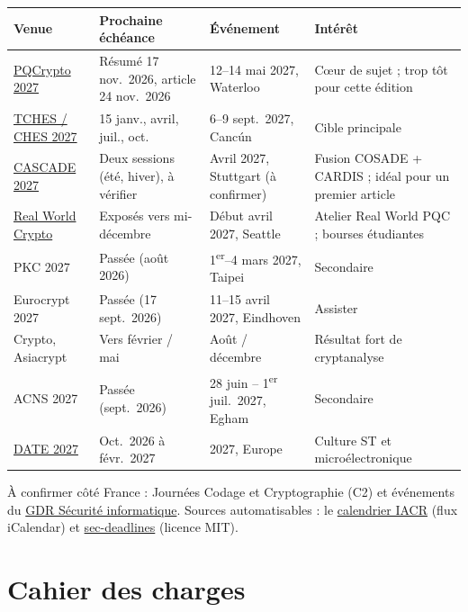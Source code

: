 \documentclass[11pt,a4paper]{article}
\begin{document}
\begin{center}\small
\begin{tabularx}{\linewidth}{P{2.6cm} P{3.3cm} P{3.2cm} L}
\toprule
\textbf{Venue} & \textbf{Prochaine échéance} & \textbf{Événement} & \textbf{Intérêt}\\
\midrule
\href{https://easychair.org/cfp/pqcrypto2027}{PQCrypto 2027} & Résumé 17 nov.\ 2026, article 24 nov.\ 2026 & 12--14 mai 2027, Waterloo & Cœur de sujet ; trop tôt pour cette édition\\
\href{https://tches.iacr.org/index.php/TCHES/submission}{TCHES / CHES 2027} & 15 janv., avril, juil., oct. & 6--9 sept.\ 2027, Cancún & Cible principale\\
\href{https://cascade-conference.org/}{CASCADE 2027} & Deux sessions (été, hiver), à vérifier & Avril 2027, Stuttgart (à confirmer) & Fusion COSADE + CARDIS ; idéal pour un premier article\\
\href{https://rwc.iacr.org/}{Real World Crypto} & Exposés vers mi-décembre & Début avril 2027, Seattle & Atelier Real World PQC ; bourses étudiantes\\
PKC 2027 & Passée (août 2026) & 1\textsuperscript{er}--4 mars 2027, Taipei & Secondaire\\
Eurocrypt 2027 & Passée (17 sept.\ 2026) & 11--15 avril 2027, Eindhoven & Assister\\
Crypto, Asiacrypt & Vers février / mai & Août / décembre & Résultat fort de cryptanalyse\\
ACNS 2027 & Passée (sept.\ 2026) & 28 juin -- 1\textsuperscript{er} juil.\ 2027, Egham & Secondaire\\
\href{https://www.date-conference.com/call-for-papers}{DATE 2027} & Oct.\ 2026 à févr.\ 2027 & 2027, Europe & Culture ST et microélectronique\\
\bottomrule
\end{tabularx}
\end{center}

\noindent À confirmer côté France : Journées Codage et Cryptographie (C2) et
événements du \href{https://gdr-securite.irisa.fr/}{GDR Sécurité informatique}.
Sources automatisables : le
\href{https://www.iacr.org/events/eventsbysubmission.php4}{calendrier IACR} (flux
iCalendar) et \href{https://sec-deadlines.github.io}{sec-deadlines} (licence MIT).

\section{Cahier des charges}
\end{document}
